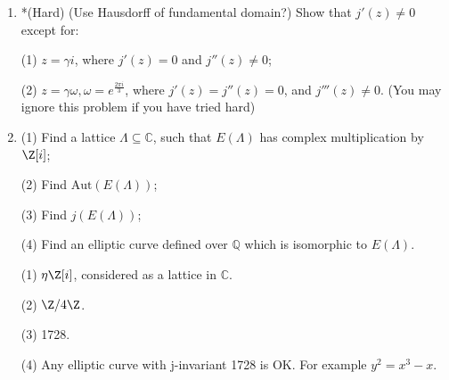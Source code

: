 \begin{enumerate}
\begin{proofc}[解答]
    So we may write $\wp(\alpha z)$ in the form $c_1+\frac{f(\wp)}{c_2\wp' + g(\wp)}$, where $f,g$ are rational functions.
    Because $\wp(\alpha z)$ is even, and $\wp$ is even, $\wp'$ is odd, there should not be $c_2 \wp'$ in the denominator, thus is $\wp(\alpha z)$ a rational funtion of $\wp(z)$.

    \end{proofc}


    \item*(Hard) (Use Hausdorff of fundamental domain?) Show that $j'(z) \neq 0$ except for:

    (1) $z = \gamma i$, where $j'(z) = 0$ and $j''(z) \neq 0$;

    (2) $z = \gamma \omega, \omega = e^{\frac{2\pi i }{3}}$, where $j'(z) = j''(z) = 0$, and $j'''(z) \neq 0$. (You may ignore this problem if you have tried hard)





    \item

    (1) Find a lattice $ \Lambda \subseteq \mathbb{C} $, such that $E(\Lambda)$ has complex multiplication by $\Z[i]$;

    (2) Find $\mathrm{Aut}(E(\Lambda))$;

    (3) Find $j(E(\Lambda))$;

    (4) Find an elliptic curve defined over $\mathbb{Q}$ which is isomorphic to $E(\Lambda)$.

    \begin{proofc}[解答]

    (1) $\eta \Z[i]$, considered as a lattice in $\mathbb{C}$.

    (2) $\Z/4\Z$.

    (3) 1728.

    (4) Any elliptic curve with j-invariant 1728 is OK. For example $y^2 = x^3 - x$.

    \end{proofc}

\end{enumerate}